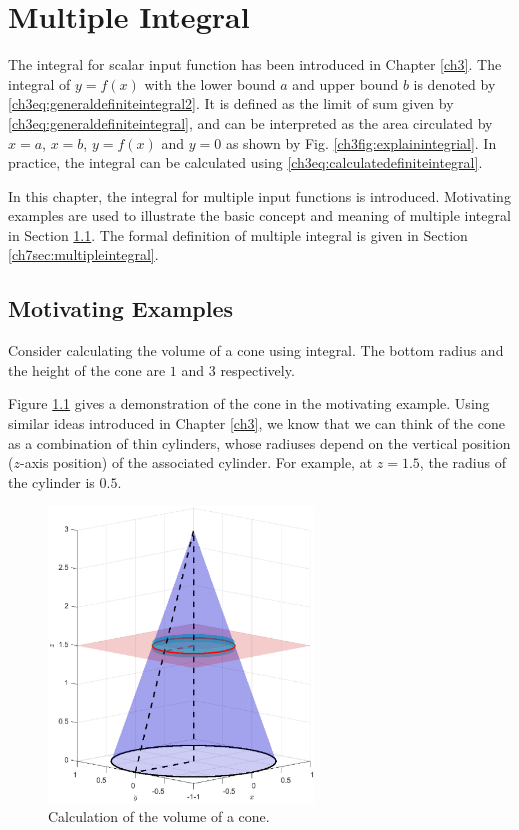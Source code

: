\chapter{Multiple Integral} \label{ch7ch}

The integral for scalar input function has been introduced in Chapter \ref{ch3}. The integral of $y=f(x)$ with the lower bound $a$ and upper bound $b$ is denoted by \eqref{ch3eq:generaldefiniteintegral2}. It is defined as the limit of sum given by \eqref{ch3eq:generaldefiniteintegral}, and can be interpreted as the area circulated by $x=a$, $x=b$, $y=f(x)$ and $y=0$ as shown by Fig. \ref{ch3fig:explainintegrial}. In practice, the integral can be calculated using \eqref{ch3eq:calculatedefiniteintegral}.

In this chapter, the integral for multiple input functions is introduced. Motivating examples are used to illustrate the basic concept and meaning of multiple integral in Section \ref{ch7sec:motivatingexp}. The formal definition of multiple integral is given in Section \ref{ch7sec:multipleintegral}.

\section{Motivating Examples} \label{ch7sec:motivatingexp}

\begin{shortbox}

Consider calculating the volume of a cone using integral. The bottom radius and the height of the cone are $1$ and $3$ respectively.

\end{shortbox}

Figure \ref{ch7fig:motivatingexp1} gives a demonstration of the cone in the motivating example. Using similar ideas introduced in Chapter \ref{ch3}, we know that we can think of the cone as a combination of thin cylinders, whose radiuses depend on the vertical position ($z$-axis position) of the associated cylinder. For example, at $z=1.5$, the radius of the cylinder is $0.5$.

\begin{figure}
	\centering
	\includegraphics[width=200pt]{chapters/chapter7/figures/motivatingexp1.eps}
	\caption{Calculation of the volume of a cone.} \label{ch7fig:motivatingexp1}
\end{figure}

